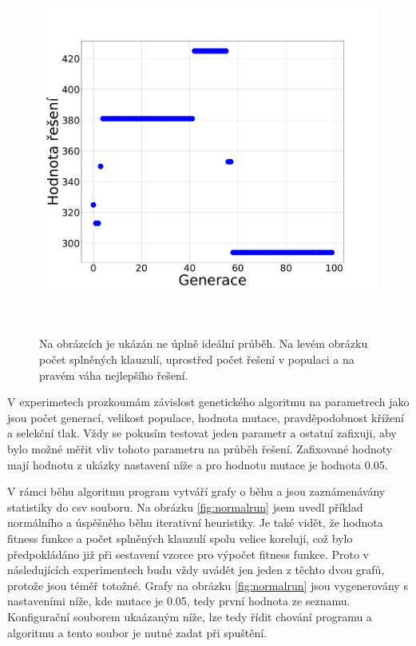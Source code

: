 \documentclass[11pt]{article}
\begin{document}
\begin{figure}
\begin{minipage}[c]{0.325\textwidth}
    \end{minipage}
    \begin{minipage}[c]{0.325\textwidth}
        \centering \includegraphics[width=\textwidth]{img/badW.pdf} 
    \end{minipage}
    \\
   \caption{Na obrázcích je ukázán ne úplně ideální průběh. Na levém obrázku počet splněných klauzulí, uprostřed počet řešení v populaci a na pravém váha nejlepšího řešení.}\label{fig:badrun}
\end{figure} 


V experimetech prozkoumám závislost genetického algoritmu na parametrech jako jsou počet generací, velikost populace, hodnota mutace, pravděpodobnost křížení a selekční tlak. Vždy se pokusím testovat jeden parametr a ostatní zafixuji, aby bylo možné měřit vliv tohoto parametru na průběh řešení. Zafixované hodnoty mají hodnotu z ukázky nastavení níže a pro hodnotu mutace je hodnota 0.05.

V rámci běhu algoritmu program vytváří grafy o běhu a jsou zaznámenávány statistiky do csv souboru. Na obrázku \ref{fig:normalrun} jsem uvedl příklad normálního a úspěšněho běhu iterativní heuristiky. Je také vidět, že hodnota fitness funkce a počet splněných klauzulí spolu velice korelují, což bylo předpokládáno již při sestavení vzorce pro výpočet fitness funkce. Proto v následujících experimentech budu vždy uvádět jen jeden z těchto dvou grafů, protože jsou téměř totožné. Grafy na obrázku \ref{fig:normalrun} jsou vygenerovány s nastaveními níže, kde mutace je 0.05, tedy první hodnota ze seznamu. Konfigurační souborem ukaázaným níže, lze tedy řídit chování programu a algoritmu a tento soubor je nutné zadat při spuštění.
\end{document}

